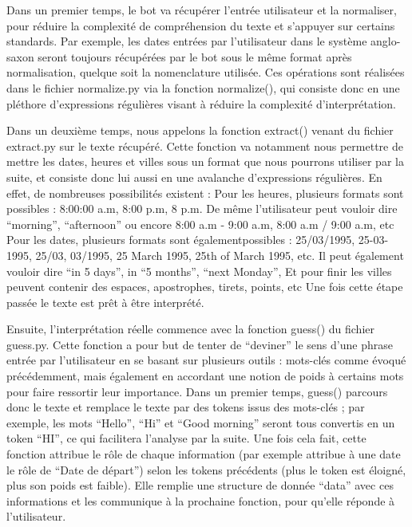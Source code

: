 \documentclass[]{article}
\begin{document}
\bigskip
\huge{\textbf{\color{title}{1) Normalisation : normalize.py}}}
\bigskip
\large{

Dans un premier temps, le bot va récupérer l’entrée utilisateur et la normaliser, pour réduire la complexité de compréhension du texte et s’appuyer sur certains standards. Par exemple, les dates entrées par l’utilisateur dans le système anglo-saxon seront toujours récupérées par le bot sous le même format après normalisation, quelque soit la nomenclature utilisée. Ces opérations sont réalisées dans le fichier normalize.py via la fonction normalize(), qui consiste donc en une pléthore d’expressions régulières visant à réduire la complexité d’interprétation.
}
\bigskip

\bigskip
\huge{\textbf{\color{title}{2) Extraction des données : extract.py}}}
\bigskip
\large{

Dans un deuxième temps, nous appelons la fonction extract() venant du fichier extract.py sur le texte récupéré. Cette fonction va notamment nous permettre de mettre les dates, heures et villes sous un format que nous pourrons utiliser par la suite, et consiste donc lui aussi en une avalanche d’expressions régulières. En effet, de nombreuses possibilités existent :
Pour les heures, plusieurs formats sont possibles : 8:00:00 a.m, 8:00 p.m, 8 p.m. De même l'utilisateur peut vouloir dire “morning”, “afternoon” ou encore 8:00 a.m - 9:00 a.m, 8:00 a.m / 9:00 a.m, etc
Pour les dates, plusieurs formats sont égalementpossibles : 25/03/1995, 25-03-1995, 25/03, 03/1995, 25 March 1995, 25th of March 1995, etc. Il peut également vouloir dire “in 5 days”, in “5 months”, “next Monday”, 
Et pour finir les villes peuvent contenir des espaces, apostrophes, tirets, points, etc
Une fois cette étape passée le texte est prêt à être interprété.
}
\bigskip

\bigskip
\huge{\textbf{\color{title}{3)Interprétation des données : guess.py}}}
\bigskip
\large{

Ensuite, l’interprétation réelle commence avec la fonction guess() du fichier guess.py. Cette fonction a pour but de tenter de “deviner” le sens d’une phrase entrée par l’utilisateur en se basant sur plusieurs outils : mots-clés comme évoqué précédemment, mais également en accordant une notion de poids à certains mots pour faire ressortir leur importance. Dans un premier temps, guess() parcours donc le texte et remplace le texte par des tokens issus des mots-clés ; par exemple, les mots “Hello”, “Hi” et “Good morning” seront tous convertis en un token “HI”, ce qui facilitera l’analyse par la suite. Une fois cela fait, cette fonction attribue le rôle de chaque information (par exemple attribue à une date le rôle de “Date de départ”) selon les tokens précédents (plus le token est éloigné, plus son poids est faible). Elle remplie une structure de donnée “data” avec ces informations et les communique à la prochaine fonction, pour qu’elle réponde à l’utilisateur.
}
\end{document}
